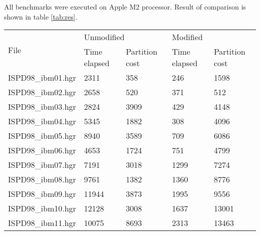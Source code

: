 \documentclass[12pt,a4paper,twocolumn]{article}
\begin{document}
	All benchmarks were executed on Apple M2 processor. Result of comparison is shown in table \ref{tab:res}.
	\begin{table}[]
		\onecolumn
		\begin{tabular}{|l|ll|ll|}
			\hline
			\multirow{2}{*}{File}              & \multicolumn{2}{l|}{Unmodified}                    & \multicolumn{2}{l|}{Modified}                      \\ \cline{2-5} 
			& \multicolumn{1}{l|}{Time elapsed} & Partition cost & \multicolumn{1}{l|}{Time elapsed} & Partition cost \\ \hline
			ISPD98\_ibm01.hgr & \multicolumn{1}{l|}{2311}         & 358            & \multicolumn{1}{l|}{246}          & 1598           \\ \hline
			ISPD98\_ibm02.hgr & \multicolumn{1}{l|}{2658}         & 520            & \multicolumn{1}{l|}{371}          & 512            \\ \hline
			ISPD98\_ibm03.hgr & \multicolumn{1}{l|}{2824}         & 3909           & \multicolumn{1}{l|}{429}          & 4148           \\ \hline
			ISPD98\_ibm04.hgr & \multicolumn{1}{l|}{5345}         & 1882           & \multicolumn{1}{l|}{308}          & 4096           \\ \hline
			ISPD98\_ibm05.hgr & \multicolumn{1}{l|}{8940}         & 3589           & \multicolumn{1}{l|}{709}          & 6086           \\ \hline
			ISPD98\_ibm06.hgr & \multicolumn{1}{l|}{4653}         & 1724           & \multicolumn{1}{l|}{751}          & 4799           \\ \hline
			ISPD98\_ibm07.hgr & \multicolumn{1}{l|}{7191}         & 3018           & \multicolumn{1}{l|}{1299}         & 7274           \\ \hline
			ISPD98\_ibm08.hgr & \multicolumn{1}{l|}{9761}         & 1382           & \multicolumn{1}{l|}{1360}         & 8776           \\ \hline
			ISPD98\_ibm09.hgr & \multicolumn{1}{l|}{11944}        & 3873           & \multicolumn{1}{l|}{1995}         & 9556           \\ \hline
			ISPD98\_ibm10.hgr & \multicolumn{1}{l|}{12128}        & 3008           & \multicolumn{1}{l|}{1637}         & 13001          \\ \hline
			ISPD98\_ibm11.hgr & \multicolumn{1}{l|}{10075}        & 8693           & \multicolumn{1}{l|}{2313}         & 13463          \\ \hline

\end{tabular}
\end{table}
\end{document}
